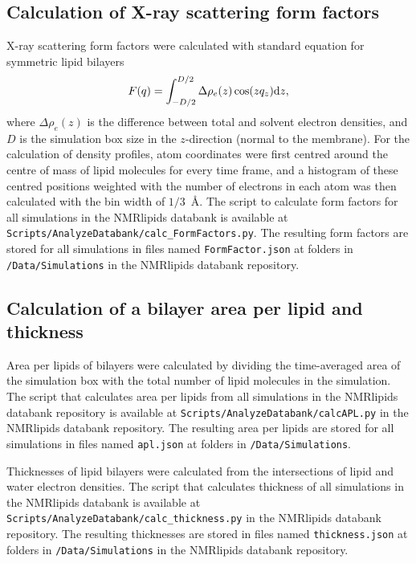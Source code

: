 \documentclass[fleqn,10pt]{wlscirep}
\begin{document}
\subsection{Calculation of X-ray scattering form factors}
X-ray scattering form factors were calculated with standard equation for symmetric lipid bilayers~\cite{ollila16}
\begin{equation}\label{FFsimpl}
F(q)=\int_{-D/2}^{D/2}\Delta \rho_e(z) \cos(zq_z) {\rm d}z,
\end{equation}
where $\Delta \rho_e(z)$ is the difference between total and solvent electron densities, and $D$ is the simulation box size in the $z$-direction (normal to the membrane). For the calculation of density profiles, atom coordinates were first centred around the centre of mass of lipid molecules for every time frame, and a histogram of these centred positions weighted with the number of electrons in each atom was then calculated with the bin width of $1/3$~\AA{}. The script to calculate form factors for all simulations in the NMRlipids databank is available at \texttt{Scripts/AnalyzeDatabank/calc\_FormFactors.py}. The resulting form factors are stored for all simulations in files named \texttt{FormFactor.json} at folders in \texttt{/Data/Simulations} in the NMRlipids databank repository.

\subsection{Calculation of a bilayer area per lipid and thickness}
Area per lipids of bilayers were calculated by dividing the time-averaged area of the simulation box with the total number of lipid molecules in the simulation. The script that calculates area per lipids from all simulations in the NMRlipids databank repository is available at \texttt{Scripts/AnalyzeDatabank/calcAPL.py} in the NMRlipids databank repository. The resulting area per lipids are stored for all simulations in files named \texttt{apl.json} at folders in \texttt{/Data/Simulations}. 

Thicknesses of lipid bilayers were calculated from the intersections of lipid and water electron densities. The script that calculates thickness of all simulations in the NMRlipids databank is available at \texttt{Scripts/AnalyzeDatabank/calc\_thickness.py} in the NMRlipids databank repository. The resulting thicknesses are stored in files named \texttt{thickness.json} at folders in \texttt{/Data/Simulations} in the NMRlipids databank repository. 
\end{document}
